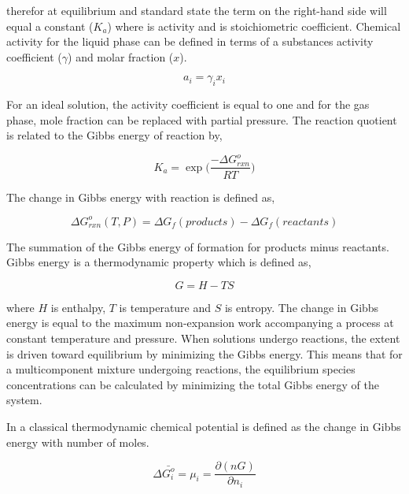 therefor at equilibrium and standard state the term on the right-hand side will equal a constant ($K_{a}$) where  is activity and  is stoichiometric coefficient. Chemical activity for the liquid phase can be defined in terms of a substances activity coefficient ($\gamma$) and molar fraction ($x$). 

 \begin{equation}
	a_{i} = \gamma_{i}x_{i}
	\label{eq:activity}
\end{equation}

For an ideal solution, the activity coefficient is equal to one and for the gas phase, mole fraction can be replaced with partial pressure. The reaction quotient is related to the Gibbs energy of reaction by, 

 \begin{equation}
	K_{a} = \exp \bigg( \frac{-\Delta G_{rxn}^{o}}{RT} \bigg)
\end{equation}

The change in Gibbs energy with reaction is defined as,

 \begin{equation}
	\Delta G_{rxn}^{o}(T,P) = \Delta G_{f}(products) - \Delta G_{f}(reactants)
	\label{eq:gibbs_rxn}
\end{equation}

The summation of the Gibbs energy of formation for products minus reactants. Gibbs energy is a thermodynamic property which is defined as, 

 \begin{equation}
	G = H - TS
	\label{eq:gibbs}
\end{equation}

where $H$ is enthalpy, $T$ is temperature and $S$ is entropy. The change in Gibbs energy is equal to the maximum non-expansion work accompanying a process at constant temperature and pressure. When solutions undergo reactions, the extent is driven toward equilibrium by minimizing the Gibbs energy. This means that for a multicomponent mixture undergoing reactions, the equilibrium species concentrations can be calculated by minimizing the total Gibbs energy of the system. 

In a classical thermodynamic chemical potential is defined as the change in Gibbs energy with number of moles.

 \begin{equation}
	\Delta \bar{G_{i}^{o}}  = \mu_{i} =  \frac{\partial (nG)}{\partial n_{i}}
	\label{eq:chemical_potential}
\end{equation}

